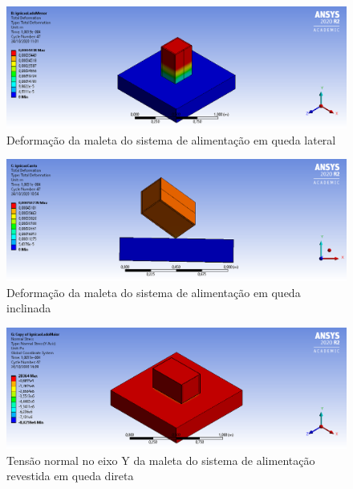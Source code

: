 \begin{apendicesenv}
\begin{figure}[htb]
    \centering
    \includegraphics[width=1.0\textwidth, angle=0]{figuras/estrutura_simulacaoImpacto/ignicaoDeformacaoLadoMenor.png}
    \caption{Deformação da maleta do sistema de alimentação em queda lateral}
    \label{fig:simulacaoImpacto_08}
\end{figure}

\begin{figure}[htb]
    \centering
    \includegraphics[width=1.0\textwidth, angle=0]{figuras/estrutura_simulacaoImpacto/ignicaoDeformacaoCanto.png}
    \caption{Deformação da maleta do sistema de alimentação em queda inclinada}
    \label{fig:simulacaoImpacto_09}
\end{figure}

\begin{figure}[htb]
    \centering
    \includegraphics[width=1.0\textwidth, angle=0]{figuras/estrutura_simulacaoImpacto/ignicaoRevestidaNormalYMaior.png}
    \caption{Tensão normal no eixo Y da maleta do sistema de alimentação revestida em queda direta}
    \label{fig:simulacaoImpacto_10}
\end{figure}


\end{apendicesenv}
